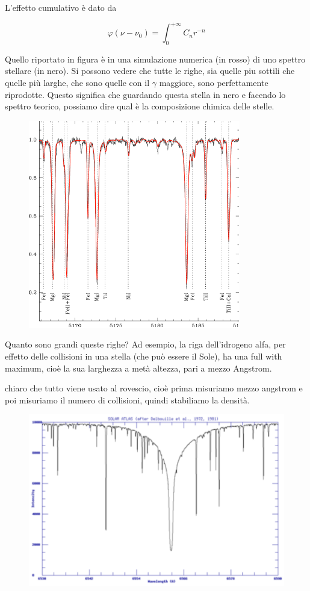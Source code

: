 L'effetto cumulativo è dato da

\begin{equation*}
  \varphi(\nu - \nu_0)=\int_{0}^{+\infty} C_n r^{-n}
\end{equation*}


Quello riportato in figura è in una simulazione numerica (in rosso) di uno spettro stellare (in nero). Si possono vedere che tutte le righe, sia quelle piu sottili che quelle più larghe, che sono quelle con il $\gamma$ maggiore, sono perfettamente riprodotte.
Questo significa che guardando questa stella in nero e facendo lo spettro teorico, possiamo dire qual è la composizione chimica delle stelle.


\begin{figure}[H]
  \centering
  \includegraphics[width=0.5\linewidth]{graficorossonero}
\label{fig:graficorossonero}
\end{figure}

Quanto sono grandi queste righe? Ad esempio, la riga dell'idrogeno alfa, per effetto delle collisioni in una stella (che può essere il Sole), ha una full with maximum, cioè la sua larghezza a metà altezza, pari a mezzo Angstrom.

\E chiaro che tutto viene usato al rovescio, cioè prima misuriamo mezzo angstrom e poi misuriamo il numero di collisioni, quindi stabiliamo la densità.

\begin{figure}[H]
  \centering
  \includegraphics[width=0.5\linewidth]{linearstark}
  \label{fig:linearstark}
\end{figure}


